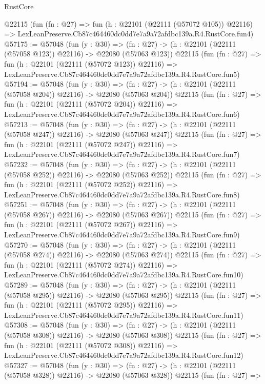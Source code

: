 \begin{lexlean}{RustCore}
\begin{coremodule}
    @22115
    (fun (fn : @27) =>
    fun (h : @22101 (@22111 (@57072 @105)) @22116) =>
    LexLeanPreserve.Cb87c464460dc0dd7e7a9a72afdbc139a.R4.RustCore.fun4)
@57175 := @57048
    (fun (y : @30) =>
    (fn : @27) -> (h : @22101 (@22111 (@57058 @123)) @22116) -> @22080 (@57063 @123))
    @22115
    (fun (fn : @27) =>
    fun (h : @22101 (@22111 (@57072 @123)) @22116) =>
    LexLeanPreserve.Cb87c464460dc0dd7e7a9a72afdbc139a.R4.RustCore.fun5)
@57194 := @57048
    (fun (y : @30) =>
    (fn : @27) -> (h : @22101 (@22111 (@57058 @204)) @22116) -> @22080 (@57063 @204))
    @22115
    (fun (fn : @27) =>
    fun (h : @22101 (@22111 (@57072 @204)) @22116) =>
    LexLeanPreserve.Cb87c464460dc0dd7e7a9a72afdbc139a.R4.RustCore.fun6)
@57213 := @57048
    (fun (y : @30) =>
    (fn : @27) -> (h : @22101 (@22111 (@57058 @247)) @22116) -> @22080 (@57063 @247))
    @22115
    (fun (fn : @27) =>
    fun (h : @22101 (@22111 (@57072 @247)) @22116) =>
    LexLeanPreserve.Cb87c464460dc0dd7e7a9a72afdbc139a.R4.RustCore.fun7)
@57232 := @57048
    (fun (y : @30) =>
    (fn : @27) -> (h : @22101 (@22111 (@57058 @252)) @22116) -> @22080 (@57063 @252))
    @22115
    (fun (fn : @27) =>
    fun (h : @22101 (@22111 (@57072 @252)) @22116) =>
    LexLeanPreserve.Cb87c464460dc0dd7e7a9a72afdbc139a.R4.RustCore.fun8)
@57251 := @57048
    (fun (y : @30) =>
    (fn : @27) -> (h : @22101 (@22111 (@57058 @267)) @22116) -> @22080 (@57063 @267))
    @22115
    (fun (fn : @27) =>
    fun (h : @22101 (@22111 (@57072 @267)) @22116) =>
    LexLeanPreserve.Cb87c464460dc0dd7e7a9a72afdbc139a.R4.RustCore.fun9)
@57270 := @57048
    (fun (y : @30) =>
    (fn : @27) -> (h : @22101 (@22111 (@57058 @274)) @22116) -> @22080 (@57063 @274))
    @22115
    (fun (fn : @27) =>
    fun (h : @22101 (@22111 (@57072 @274)) @22116) =>
    LexLeanPreserve.Cb87c464460dc0dd7e7a9a72afdbc139a.R4.RustCore.fun10)
@57289 := @57048
    (fun (y : @30) =>
    (fn : @27) -> (h : @22101 (@22111 (@57058 @295)) @22116) -> @22080 (@57063 @295))
    @22115
    (fun (fn : @27) =>
    fun (h : @22101 (@22111 (@57072 @295)) @22116) =>
    LexLeanPreserve.Cb87c464460dc0dd7e7a9a72afdbc139a.R4.RustCore.fun11)
@57308 := @57048
    (fun (y : @30) =>
    (fn : @27) -> (h : @22101 (@22111 (@57058 @308)) @22116) -> @22080 (@57063 @308))
    @22115
    (fun (fn : @27) =>
    fun (h : @22101 (@22111 (@57072 @308)) @22116) =>
    LexLeanPreserve.Cb87c464460dc0dd7e7a9a72afdbc139a.R4.RustCore.fun12)
@57327 := @57048
    (fun (y : @30) =>
    (fn : @27) -> (h : @22101 (@22111 (@57058 @328)) @22116) -> @22080 (@57063 @328))
    @22115
    (fun (fn : @27) =>

\end{coremodule}
\end{lexlean}
